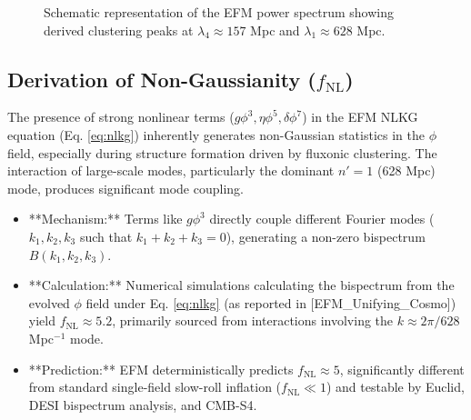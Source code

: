 \documentclass[11pt]{article}
\begin{document}
\begin{figure}[htbp]
    \centering
    \caption{Schematic representation of the EFM power spectrum showing derived clustering peaks at \(\lambda_4 \approx 157\) Mpc and \(\lambda_1 \approx 628\) Mpc.}
    \label{fig:efm_scales}
\end{figure}


\subsection{Derivation of Non-Gaussianity (\(f_{\text{NL}}\))}
The presence of strong nonlinear terms (\(g\phi^3, \eta\phi^5, \delta\phi^7\)) in the EFM NLKG equation (Eq. \ref{eq:nlkg}) inherently generates non-Gaussian statistics in the \(\phi\) field, especially during structure formation driven by fluxonic clustering. The interaction of large-scale modes, particularly the dominant \(n'=1\) (628 Mpc) mode, produces significant mode coupling.
\begin{itemize}
    \item **Mechanism:** Terms like \(g\phi^3\) directly couple different Fourier modes (\(k_1, k_2, k_3\) such that \(k_1+k_2+k_3=0\)), generating a non-zero bispectrum \(B(k_1, k_2, k_3)\).
    \item **Calculation:** Numerical simulations calculating the bispectrum from the evolved \(\phi\) field under Eq. \ref{eq:nlkg} (as reported in [EFM\_Unifying\_Cosmo]) yield \(f_{\text{NL}} \approx 5.2\), primarily sourced from interactions involving the \(k \approx 2\pi/628\) Mpc\(^{-1}\) mode.
    \item **Prediction:** EFM deterministically predicts \(f_{\text{NL}} \approx 5\), significantly different from standard single-field slow-roll inflation (\(f_{\text{NL}} \ll 1\)) and testable by Euclid, DESI bispectrum analysis, and CMB-S4.
\end{itemize}
\end{document}

